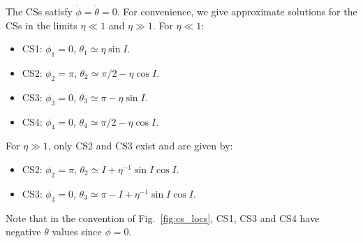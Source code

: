 \documentclass[twocolumn,twocolappendix]{aastex63}
\newcommand*{\p}[1]{\left(#1\right)}
\begin{document}


The CSs satisfy $\dot{\phi} = \dot{\theta} = 0$. For convenience, we give
approximate solutions for the CSs in the limits $\eta \ll 1$ and $\eta \gg 1$.
For $\eta \ll 1$:
\begin{itemize}
    \item CS1: $\phi_1 = 0$, $\theta_1 \simeq \eta \sin I$.
    \item CS2: $\phi_2 = \pi$, $\theta_2 \simeq \pi / 2 - \eta \cos I$.
    \item CS3: $\phi_3 = 0$, $\theta_3 \simeq \pi - \eta \sin I$.
    \item CS4: $\phi_4 = 0$, $\theta_4 \simeq \pi / 2 - \eta \cos I$.
\end{itemize}
For $\eta \gg 1$, only CS2 and CS3 exist and are given by:
\begin{itemize}
    \item CS2: $\phi_2 = \pi$, $\theta_2 \simeq I + \eta^{-1}\sin I \cos I$.
    \item CS3: $\phi_3 = 0$, $\theta_3 \simeq \pi - I + \eta^{-1}\sin I \cos I$.
\end{itemize}
Note that in the convention of Fig.~\ref{fig:cs_locs}, CS1, CS3 and CS4 have
negative $\theta$ values since $\phi=0$.
\end{document}
